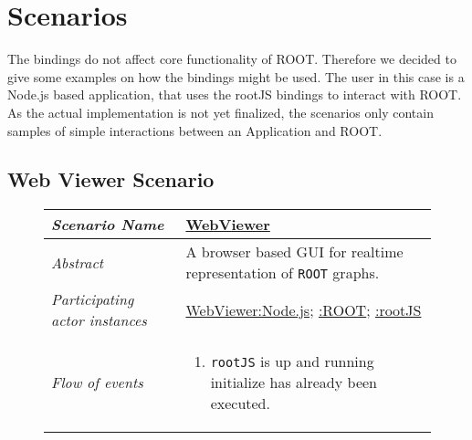 \section{Scenarios}

The bindings do not affect core functionality of ROOT. Therefore 
we decided to give some examples on how the bindings might be used. The 
user in this case is a Node.js based application, that uses the rootJS bindings 
to interact with ROOT. As the actual implementation is not yet 
finalized, the scenarios only contain samples of simple interactions 
between an Application and ROOT.

\subsection{Web Viewer Scenario}
\begin{figure}[htb]
	\centering
	\begin{longtable}{p{3cm} @{\hskip 1cm} p{12cm}}
		\hline
		
		\textit{Scenario Name} & \underline{WebViewer}\\
		\hline
	
		\textit{Abstract} & A browser based GUI for realtime representation of \texttt{ROOT} graphs.\\
		\hline
	
		\textit{Participating actor instances} & \underline{WebViewer:Node.js}; \underline{:ROOT}; \underline{:rootJS}\\
		\hline
	
		\textit{Flow of events} & 
		\begin{enumerate}
			\item \texttt{rootJS} is up and running initialize has already been executed.
			

\end{enumerate}
\end{longtable}
\end{figure}
